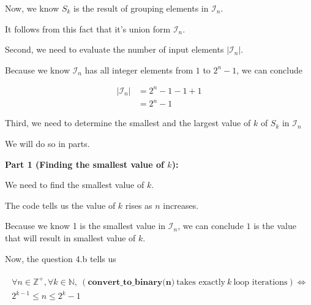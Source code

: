 \documentclass[12pt]{article}
\begin{document}
\begin{enumerate}[a.]
    \bigskip

    Now, we know $S_k$ is the result of grouping elements in $\mathcal{I}_n$.

    \bigskip

    It follows from this fact that it's union form $\mathcal{I}_n$.

    \bigskip

    Second, we need to evaluate the number of input elements $\lvert \mathcal{I}_n \rvert$.

    \bigskip

    Because we know $\mathcal{I}_n$ has all integer elements from $1$ to $2^n - 1$,
    we can conclude

    \begin{align}
        \lvert \mathcal{I}_n \rvert &= 2^n - 1 - 1 + 1\\
        &= 2^n - 1
    \end{align}

    \bigskip

    Third, we need to determine the smallest and the largest value of $k$
    of $S_k$ in $\mathcal{I}_n$

    \bigskip

    We will do so in parts.

    \bigskip

    \textbf{Part 1 (Finding the smallest value of $k$):}

    \bigskip

    We need to find the smallest value of $k$.

    \bigskip

    The code tells us the value of $k$ rises as $n$ increases.

    \bigskip

    Because we know 1 is the smallest value in $\mathcal{I}_n$, we can conclude
    $1$ is the value that will result in smallest value of $k$.

    \bigskip

    Now, the question 4.b tells us

    \begin{align}
        \begin{split}
        \forall n \in \mathbb{Z}^+, \forall k \in \mathbb{N},\: (\textbf{
        convert\_to\_binary(n)}\:\text{takes exactly}\:k\:\text{loop iterations}) \Leftrightarrow
        \\ 2^{k-1} \leq n \leq 2^k -1
        \end{split}
    \end{align}


\end{enumerate}
\end{document}
